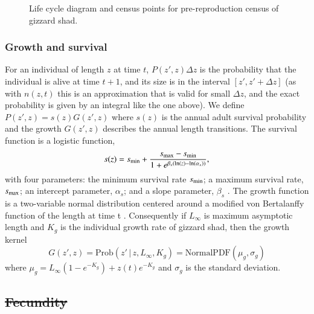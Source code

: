 \documentclass[preprint,review,12pt,authoryear]{elsarticle}
\def\ds{\displaystyle}
\providecommand{\DIFaddtex}[1]{{\protect\color{blue}\uwave{#1}}} %
\providecommand{\DIFdeltex}[1]{{\protect\color{red}\sout{#1}}}                      %
\providecommand{\DIFaddbegin}{} %
\providecommand{\DIFaddend}{} %
\providecommand{\DIFdelbegin}{} %
\providecommand{\DIFdelend}{} %
\providecommand{\DIFaddendFL}{} %
\providecommand{\DIFadd}[1]{\texorpdfstring{\DIFaddtex{#1}}{#1}} %
\providecommand{\DIFdel}[1]{\texorpdfstring{\DIFdeltex{#1}}{}} %
\begin{document}
\begin{figure}
\begin{center}
\DIFaddendFL %
\end{center}
 \caption{\small{Life cycle diagram and census points for pre-reproduction census of gizzard shad.}}
 \label{life_cycle}
\end{figure}

\subsubsection{Growth and survival}
For an individual of length $z$ at time $t$, $P(z',z)\Delta z$ is the probability that the individual is alive at time $t+1$, and its size is in the interval $[z', z' + \Delta z]$ (as with $n(z,t)$ this is an approximation that is valid for small $\Delta z$, and the exact probability is given by an integral like the one above). We define $P(z', z) = s(z)G(z',z)$ where $s(z)$ is the annual adult survival probability and the growth $G(z',z)$ describes the annual length transitions. 
The survival function is a logistic function,
\begin{equation}\label{eq:surv}
s(z) = s_{\rm min} + \frac{s_{\rm max}-s_{\rm min}}{1+e^{\beta_s(\ln(z)-\ln(\alpha_s))}},
\end{equation}
with four parameters: the minimum survival rate $s_{\rm min}$; a maximum survival rate, $s_{\rm max}$; an intercept parameter, $\alpha_{s}$; and a slope parameter, $\beta_{s}$ \citep{bolker2008ecological}.  
The growth function is a two-variable normal distribution centered around a modified von Bertalanffy function of the length at time t \citep{erickson2017integral}.  
Consequently if $L_\infty$ is maximum asymptotic length and $K_g$ is the individual growth rate of gizzard shad, then the growth kernel
$$\ds G(z',z) = \mathrm{Prob}(z' \, | \,  z, L_{\infty}, K_g) = \mathrm{Normal PDF}(\mu_g, \sigma_g)$$
where $\mu_g =  L_{\infty} \left(1-e^{-K_g} \right) + z(t)e^{-K_g}$ and $\sigma_g$ is the standard deviation.

\DIFdelbegin \subsection{\DIFdel{Fecundity}}
\addtocounter{subsection}{-1}%
\DIFdelend \DIFaddbegin \subsubsection{\DIFadd{Fecundity}}
\DIFaddend 
\end{document}
